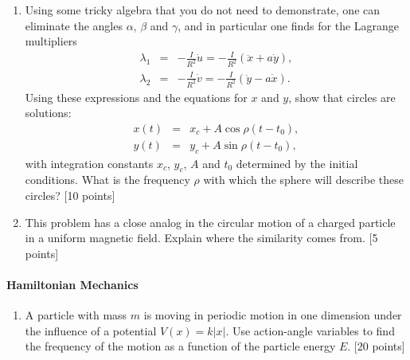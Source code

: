\documentclass[letterpaper,11pt]{article}
\begin{document}
\begin{enumerate}
\begin{enumerate}
  \item Using some tricky algebra that you do not need to demonstrate, one can eliminate the angles $\alpha$, $\beta$ and $\gamma$, and in particular one finds for the Lagrange multipliers
  \begin{eqnarray*}
   \lambda_1 & = & -\frac{I}{R^2}\dot{u} = -\frac{I}{R^2} (\ddot{x} + a \dot{y}), \\
   \lambda_2 & = & -\frac{I}{R^2}\dot{v} = -\frac{I}{R^2} (\ddot{y} - a \dot{x}).
  \end{eqnarray*}
  Using these expressions and the equations for $x$ and $y$, show that circles are solutions:
  \begin{eqnarray*}
   x(t) & = & x_c + A \cos \rho (t - t_0), \\
   y(t) & = & y_c + A \sin \rho (t - t_0),
  \end{eqnarray*}
  with integration constants $x_c$, $y_c$, $A$ and $t_0$ determined by the initial conditions.  What is the frequency $\rho$ with which the sphere will describe these circles? [10 points]
  \item This problem has a close analog in the circular motion of a charged particle in a uniform magnetic field.  Explain where the similarity comes from. [5 points]
 \end{enumerate}
\end{enumerate}


\paragraph*{Hamiltonian Mechanics}
\begin{enumerate}[resume]
 \item A particle with mass $m$ is moving in periodic motion in one dimension under the influence of a potential $V(x) = k|x|$.  Use action-angle variables to find the frequency of the motion as a function of the particle energy $E$. [20 points]
 \begin{center}
 \end{center}
\end{enumerate}
\end{document}
